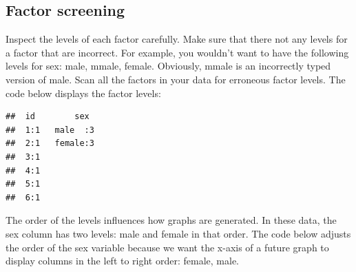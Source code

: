 \documentclass[
]{krantz}
\makeatletter
\newenvironment{Shaded}{\begin{snugshade}}{\end{snugshade}}
\newcommand{\DataTypeTok}[1]{\textcolor[rgb]{0.27,0.27,0.27}{#1}}
\newcommand{\KeywordTok}[1]{\textcolor[rgb]{0.27,0.27,0.27}{\textbf{#1}}}
\newcommand{\NormalTok}[1]{#1}
\newcommand{\OperatorTok}[1]{\textcolor[rgb]{0.43,0.43,0.43}{\textbf{#1}}}
\newcommand{\StringTok}[1]{\textcolor[rgb]{0.5,0.5,0.5}{#1}}
\newenvironment{kframe}{%
\medskip{}
\setlength{\fboxsep}{.8em}
 \def\at@end@of@kframe{}%
 \ifinner\ifhmode%
  \def\at@end@of@kframe{\end{minipage}}%
  \begin{minipage}{\columnwidth}%
 \fi\fi%
 \def\FrameCommand##1{\hskip\@totalleftmargin \hskip-\fboxsep
 \colorbox{shadecolor}{##1}\hskip-\fboxsep
     \hskip-\linewidth \hskip-\@totalleftmargin \hskip\columnwidth}%
 \MakeFramed {\advance\hsize-\width
   \@totalleftmargin\z@ \linewidth\hsize
   \@setminipage}}%
 {\par\unskip\endMakeFramed%
 \at@end@of@kframe}
\renewenvironment{Shaded}{\begin{kframe}}{\end{kframe}}
\makeatother
\begin{document}
\begin{Shaded}
\end{Shaded}

\hypertarget{factor-screening-2}{%
\subsection{Factor screening}\label{factor-screening-2}}

Inspect the levels of each factor carefully. Make sure that there not any levels for a factor that are incorrect. For example, you wouldn't want to have the following levels for sex: male, mmale, female. Obviously, mmale is an incorrectly typed version of male. Scan all the factors in your data for erroneous factor levels. The code below displays the factor levels:

\begin{Shaded}
\end{Shaded}

\begin{verbatim}
##  id        sex   
##  1:1   male  :3  
##  2:1   female:3  
##  3:1             
##  4:1             
##  5:1             
##  6:1
\end{verbatim}

The order of the levels influences how graphs are generated. In these data, the sex column has two levels: male and female in that order. The code below adjusts the order of the sex variable because we want the x-axis of a future graph to display columns in the left to right order: female, male.

\begin{Shaded}
\end{Shaded}
\end{document}
